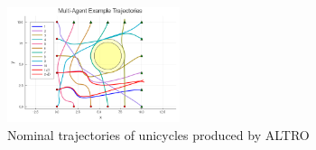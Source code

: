 \begin{figure}[t]
	\centering
	\includegraphics[width=0.45\textwidth]{figures/MA.png}
	\caption{Nominal trajectories of unicycles produced by ALTRO}
\end{figure}\label{fig:MA}


